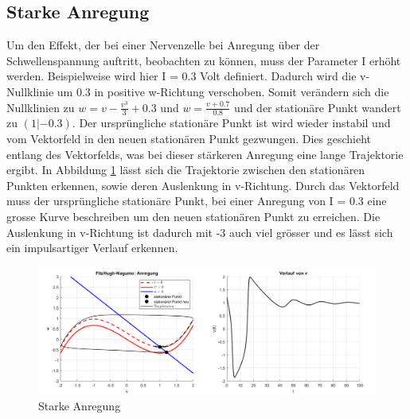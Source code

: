 \begin{refsection}
\subsection{Starke Anregung}
Um den Effekt, der bei einer Nervenzelle bei Anregung über der Schwellenspannung auftritt, beobachten zu können, muss
der Parameter I erhöht werden.
Beispielweise wird hier I = 0.3 Volt definiert.
Dadurch wird die v-Nullklinie um 0.3 in positive w-Richtung verschoben.
Somit verändern sich die Nullklinien zu \( w = v - \frac{v^3}{3} + 0.3\)
und \(w = \frac{v + 0.7}{0.8}\) und der stationäre Punkt wandert zu \((1 |-0.3)\).
Der ursprüngliche stationäre Punkt ist wird wieder instabil und vom Vektorfeld in den neuen stationären Punkt
gezwungen.
Dies geschieht entlang des Vektorfelds, was bei dieser stärkeren Anregung eine lange Trajektorie ergibt.
In Abbildung \ref{fig:starkeAnregung} lässt sich die Trajektorie zwischen den stationären Punkten erkennen, sowie
deren Auslenkung in v-Richtung.
Durch das Vektorfeld muss der ursprüngliche stationäre Punkt, bei einer Anregung von I = 0.3 eine grosse Kurve
beschreiben um den neuen stationären Punkt zu erreichen.
Die Auslenkung in v-Richtung ist dadurch mit -3 auch viel grösser und es lässt sich ein impulsartiger Verlauf erkennen.
\begin{figure}[H]
    \centering
    \includegraphics[width=\textwidth]{papers/nerven/Bilder/starkeAnregung.png}
    \caption{Starke Anregung}
    \label{fig:starkeAnregung}
\end{figure}


\end{refsection}
